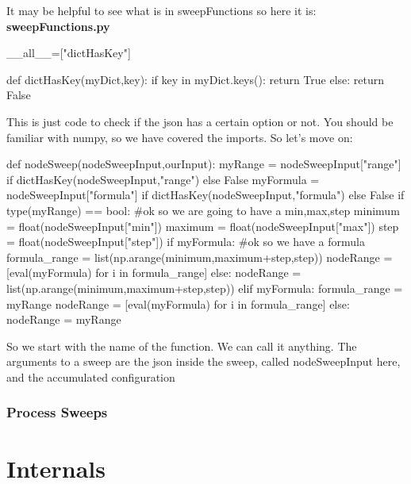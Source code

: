 \documentclass[titlepage]{article}
\let\oldsection\section
\renewcommand\section{\clearpage\oldsection}
\begin{document}
It may be helpful to see what is in sweepFunctions so here it is:\\
\textbf{sweepFunctions.py}
\begin{code}
__all__=["dictHasKey"]

def dictHasKey(myDict,key):
    if key in myDict.keys():
        return True
    else:
        return False

\end{code}

This is just code to check if the json has a certain option or not.
You should be familiar with numpy, so we have covered the imports.
So let's move on:
\begin{code}
def nodeSweep(nodeSweepInput,ourInput):
    myRange = nodeSweepInput["range"] if dictHasKey(nodeSweepInput,"range") else False
    myFormula = nodeSweepInput["formula"] if dictHasKey(nodeSweepInput,"formula") else False
    if type(myRange) == bool:
        #ok so we are going to have a min,max,step
        minimum = float(nodeSweepInput["min"])
        maximum = float(nodeSweepInput["max"])
        step = float(nodeSweepInput["step"])
        if myFormula:
            #ok so we have a formula
            formula_range = list(np.arange(minimum,maximum+step,step))
            nodeRange = [eval(myFormula) for i in formula_range]
        else:
            nodeRange = list(np.arange(minimum,maximum+step,step))
    elif myFormula:
        formula_range = myRange
        nodeRange = [eval(myFormula) for i in formula_range]
    else:
        nodeRange = myRange
\end{code}

So we start with the name of the function.  We can call it anything.  The arguments to a sweep are the json inside the sweep, called
nodeSweepInput here, and the accumulated configuration
\subsubsection{Process Sweeps}





\section{Internals}
\
\end{document}
